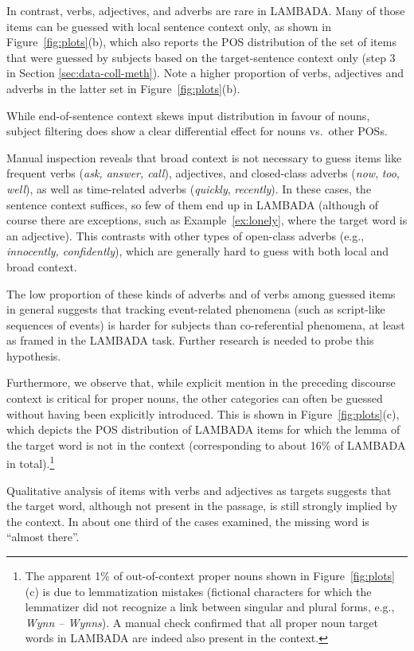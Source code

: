 In contrast, verbs, adjectives, and adverbs are rare in LAMBADA. Many of those items can be guessed with local sentence context only, as shown in Figure~\ref{fig:plots}(b), which  also reports the POS distribution of the set of items that were guessed by subjects based on the target-sentence context only (step 3 in Section \ref{sec:data-coll-meth}). Note a higher proportion of verbs, adjectives and adverbs in the latter set in Figure~\ref{fig:plots}(b). 

While end-of-sentence context skews input distribution in favour of nouns, subject filtering does show a clear differential effect for nouns vs.~other POSs. 

 Manual inspection reveals that broad context is not necessary to guess items like frequent verbs ({\em ask, answer, call}), adjectives, and closed-class adverbs ({\em now}, {\em too}, {\em well}), as well as time-related adverbs ({\em quickly}, {\em recently}).  In these cases, the sentence context suffices, so few of them end up in LAMBADA (although of course there are exceptions, such as
Example~\ref{ex:lonely}, where the target word is an adjective).  This contrasts with other types of open-class adverbs (e.g., {\em innocently, confidently}), which are generally hard to guess with both local and broad context. 

The low proportion of these kinds of adverbs and of verbs among guessed items in general suggests that tracking event-related phenomena (such as script-like sequences of events) is harder for subjects than co-referential phenomena, at least as framed in the LAMBADA task. Further research is needed to probe this hypothesis.

Furthermore, we observe that, while explicit mention in the preceding discourse context is critical for proper nouns, the other categories can often be guessed without having been explicitly introduced. This is shown in Figure~\ref{fig:plots}(c), which depicts the POS distribution of LAMBADA items for which the lemma of the target word is not in the context (corresponding to about 16\% of LAMBADA in
total).\footnote{The apparent 1\% of out-of-context proper nouns shown in Figure~\ref{fig:plots}(c) is due to lemmatization mistakes (fictional characters for which the lemmatizer did not recognize a link between singular and plural forms, e.g., {\em Wynn -- Wynns}). A manual check confirmed that all proper noun target words in LAMBADA are indeed also present in the context.} 

Qualitative analysis of items with verbs and adjectives as targets suggests that the target word, although not present in the passage, is still strongly implied by the context. In about one third of the cases examined, the missing word is ``almost there''.

